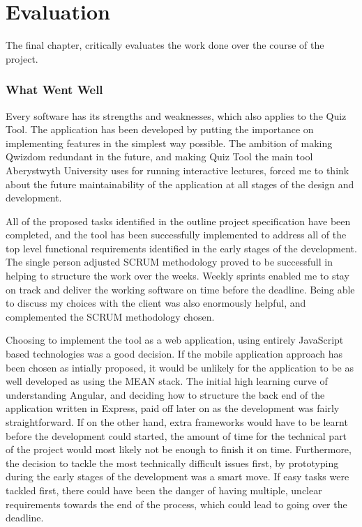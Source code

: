 \chapter{Evaluation}

The final chapter, critically evaluates the work done over the course of the project.

\subsection{What Went Well}
Every software has its strengths and weaknesses, which also applies to the Quiz Tool.
The application has been developed by putting the importance on implementing
features in the simplest way possible. The ambition of making Qwizdom redundant
in the future, and making Quiz Tool the main tool Aberystwyth University uses
for running interactive lectures, forced me to think about the future maintainability
of the application at all stages of the design and development.

All of the proposed tasks identified in the outline project specification have been
completed, and the tool has been successfully implemented to address all of the
top level functional requirements identified in the early stages of the development.
The single person adjusted SCRUM methodology proved to be successfull in helping
to structure the work over the weeks. Weekly sprints enabled me to stay on track
and deliver the working software on time before the deadline. Being able to discuss
my choices with the client was also enormously helpful, and complemented the
SCRUM methodology chosen.

Choosing to implement the tool as a web application, using entirely JavaScript
based technologies was a good decision. If the mobile application approach has
been chosen as intially proposed, it would be unlikely for the application to be
as well developed as using the MEAN stack. The initial high learning curve of
understanding Angular, and deciding how to structure the back end of the application
written in Express, paid off later on as the development was fairly straightforward.
If on the other hand, extra frameworks would have to be learnt before the development
could started, the amount of time for the technical part of the project would most
likely not be enough to finish it on time. Furthermore, the decision to tackle the most technically
difficult issues first, by prototyping during the early stages of the development
was a smart move. If easy tasks were tackled first, there could have been the
danger of having multiple, unclear requirements towards the end of the process, which
could lead to going over the deadline.

